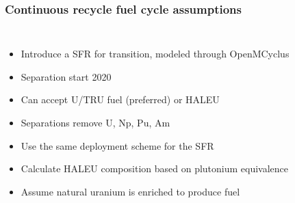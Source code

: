 \begin{frame}
    \frametitle{Continuous recycle fuel cycle assumptions}
    \begin{columns}
        
    \column[t]{6cm}
    

        \column[t]{4.5cm}
        \begin{itemize}
            \item Introduce a \gls{SFR} for transition, modeled through 
                  OpenMCyclus
            \item Separation start 2020
            \item Can accept U/TRU fuel (preferred) or \gls{HALEU}
            \item Separations remove U, Np, Pu, Am
            \item<2-> Use the same deployment scheme for the \gls{SFR}
            \item<2-> Calculate \gls{HALEU} composition based on plutonium
                      equivalence
            \item<3-> Assume natural uranium is enriched to produce 
                  fuel
        \end{itemize}

\end{columns}
\end{frame}


